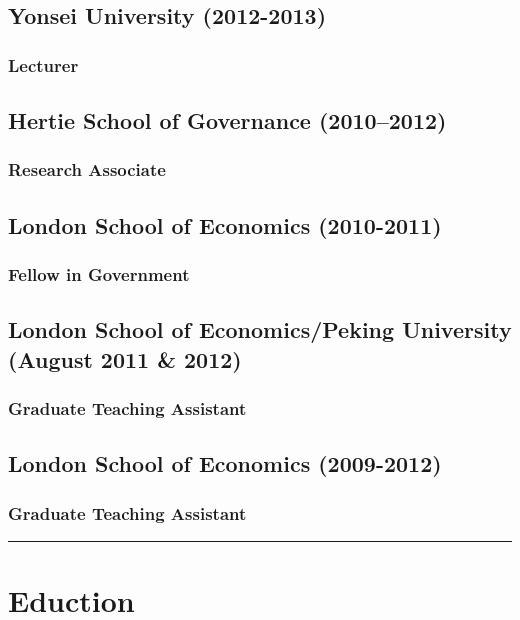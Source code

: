 \documentclass[a4paper]{article}
\begin{document}
\subsection*{Yonsei University (2012-2013)}
{\subsubsection*{Lecturer}

\subsection*{Hertie School of Governance (2010--2012)}
\subsubsection*{Research Associate}

\subsection*{London School of Economics (2010-2011)}
\subsubsection*{Fellow in Government}

\subsection*{London School of Economics/Peking University (August 2011 \& 2012)}
\subsubsection*{Graduate Teaching Assistant}

\subsection*{London School of Economics (2009-2012)}
\subsubsection*{Graduate Teaching Assistant}

\vspace{0.25cm}
\medskip\hrule height 1pt
\vspace{0.5cm}


\section*{Eduction}

}
\end{document}
